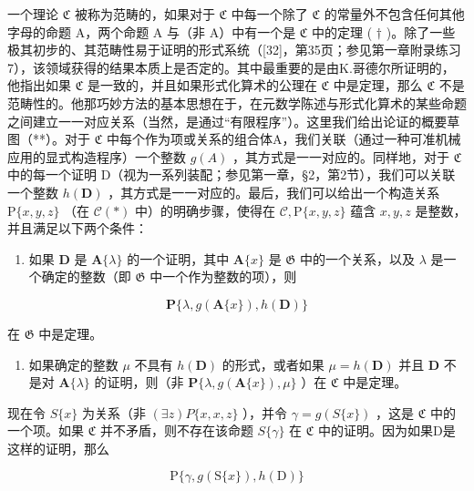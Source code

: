一个理论 \(\mathfrak{C}\) 被称为范畴的，如果对于 \(\mathfrak{C}\) 中每一个除了 \(\mathfrak{C}\) 的常量外不包含任何其他字母的命题 A，两个命题 A 与（非 A）中有一个是 \(\mathfrak{C}\) 中的定理 ( \(\dagger\) )。除了一些极其初步的、其范畴性易于证明的形式系统（{[}32{]}，第35页；参见第一章附录练习7），该领域获得的结果本质上是否定的。其中最重要的是由K.哥德尔所证明的，他指出如果 \(\mathfrak{C}\) 是一致的，并且如果形式化算术的公理在 \(\mathfrak{C}\) 中是定理，那么 \(\mathfrak{C}\) 不是范畴性的。他那巧妙方法的基本思想在于，在元数学陈述与形式化算术的某些命题之间建立一一对应关系（当然，是通过“有限程序”）。这里我们给出论证的概要草图（**）。对于 \(\mathfrak{C}\) 中每个作为项或关系的组合体A，我们关联（通过一种可准机械应用的显式构造程序）一个整数 \(g(A)\) ，其方式是一一对应的。同样地，对于 \(\mathfrak{C}\) 中的每一个证明 D（视为一系列装配；参见第一章，§2，第2节），我们可以关联一个整数 \(h(\mathbf{D})\) ，其方式是一一对应的。最后，我们可以给出一个构造关系 \(\mathrm{P}\{x, y, z\}\) （在 \(\mathcal{C} (*)\) 中）的明确步骤，使得在 \(\mathcal{C}, \mathrm{P}\{x, y, z\}\) 蕴含 \(x, y, z\) 是整数，并且满足以下两个条件：

\begin{enumerate}
\def\labelenumi{(\arabic{enumi})}
\tightlist
\item
  如果 \(\mathbf{D}\) 是 \(\mathbf{A}\{\lambda\}\) 的一个证明，其中 \(\mathbf{A}\{x\}\) 是 \(\mathfrak{G}\) 中的一个关系，以及 \(\lambda\) 是一个确定的整数（即 \(\mathfrak{G}\) 中一个作为整数的项），则
\end{enumerate}

\[
\mathbf {P} \{\lambda , g (\mathbf {A} \{x \}), h (\mathbf {D}) \}
\]

在 \(\mathfrak{G}\) 中是定理。

\begin{enumerate}
\def\labelenumi{(\arabic{enumi})}
\setcounter{enumi}{1}
\tightlist
\item
  如果确定的整数 \(\mu\) 不具有 \(h(\mathbf{D})\) 的形式，或者如果 \(\mu = h(\mathbf{D})\) 并且 \(\mathbf{D}\) 不是对 \(\mathbf{A}\{\lambda\}\) 的证明，则（非 \(\mathbf{P}\{\lambda, g(\mathbf{A}\{x\}), \mu\}\) ）在 \(\mathfrak{C}\) 中是定理。
\end{enumerate}

现在令 \(S\{x\}\) 为关系（非 \((\exists z)P\{x, x, z\}\) ），并令 \(\gamma = g(S\{x\})\) ，这是 \(\mathfrak{C}\) 中的一个项。如果 \(\mathfrak{C}\) 并不矛盾，则不存在该命题 \(S\{\gamma\}\) 在 \(\mathfrak{C}\) 中的证明。因为如果D是这样的证明，那么

\[
\mathrm{P} \{\gamma , g (\mathrm{S} \{x \}), h (\mathrm{D}) \}
\]

